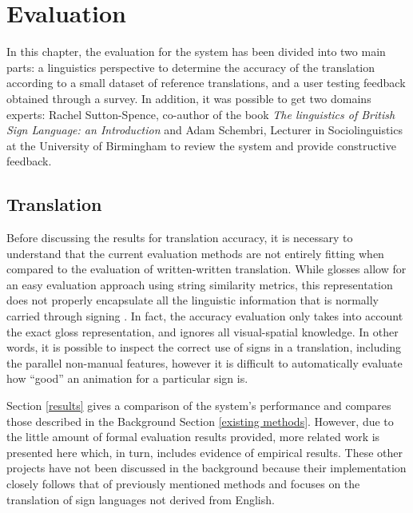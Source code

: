 \documentclass[12pt]{ociamthesis}  %
\begin{document}
\chapter{Evaluation}
In this chapter, the evaluation for the system has been divided into two main parts: a linguistics perspective to determine the accuracy of the translation according to a small dataset of reference translations, and a user testing feedback obtained through a survey. In addition, it was possible to get two domains experts: Rachel Sutton-Spence, co-author of the book \textit{The linguistics of British Sign Language: an Introduction} and Adam Schembri, Lecturer in Sociolinguistics at the University of Birmingham to review the system and provide constructive feedback.
\section{Translation}
Before discussing the results for translation accuracy, it is necessary to understand that the current evaluation methods are not entirely fitting when compared to the evaluation of written-written translation. While glosses allow for an easy evaluation approach using string similarity metrics, this representation does not properly encapsulate all the linguistic information that is normally carried through signing . In fact, the accuracy evaluation only takes into account the exact gloss representation, and ignores all visual-spatial knowledge. In other words, it is possible to inspect the correct use of signs in a translation, including the parallel non-manual features, however it is difficult to automatically evaluate how ``good'' an animation for a particular sign is.

Section \ref{results} gives a comparison of the system's performance and compares those described in the Background Section \ref{existing methods}. However, due to the little amount of formal evaluation results provided, more related work is presented here which, in turn, includes evidence of empirical results. These other projects have not been discussed in the background because their implementation closely follows that of  previously mentioned methods and focuses on the translation of sign languages not derived from English.
\end{document}
